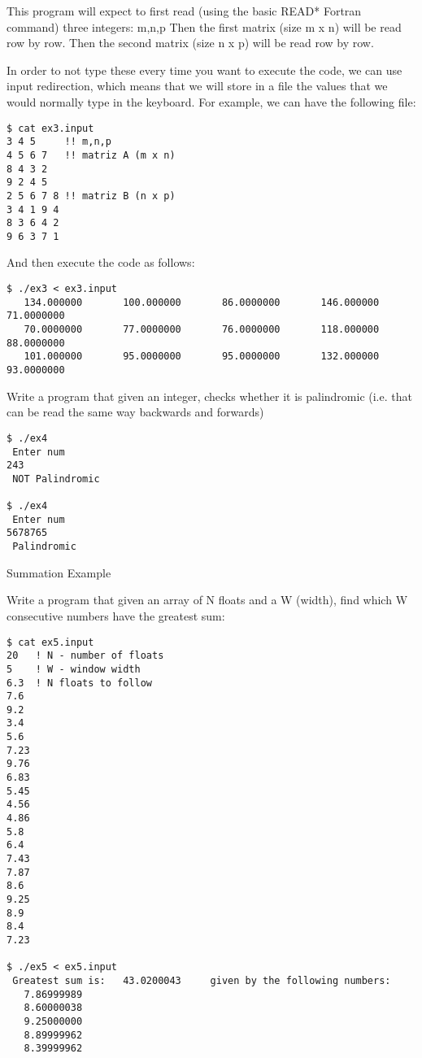 This program will expect to first read (using the basic READ* Fortran command) three integers: m,n,p
Then the first matrix (size m x n) will be read row by row.
Then the second matrix (size n x p) will be read row by row.

In order to not type these every time you want to execute the code, we can use
input redirection, which means that we will store in a file the values that we would
normally type in the keyboard. For example, we can have the following file:

\begin{verbatim}
$ cat ex3.input
3 4 5     !! m,n,p
4 5 6 7   !! matriz A (m x n)
8 4 3 2
9 2 4 5
2 5 6 7 8 !! matriz B (n x p)
3 4 1 9 4
8 3 6 4 2
9 6 3 7 1
\end{verbatim}

And then execute the code as follows:

\begin{verbatim}
$ ./ex3 < ex3.input
   134.000000       100.000000       86.0000000       146.000000       71.0000000    
   70.0000000       77.0000000       76.0000000       118.000000       88.0000000    
   101.000000       95.0000000       95.0000000       132.000000       93.0000000
\end{verbatim}

 {Write a program that given an integer, checks whether it is
  palindromic (i.e. that can be read the same way backwards and forwards)}
\label{ex:basic-palin}

\begin{verbatim}
$ ./ex4
 Enter num
243
 NOT Palindromic

$ ./ex4
 Enter num
5678765
 Palindromic
\end{verbatim}

 {Summation Example}
\label{ex:basic-summation}

Write a program that given an array of N floats and a W (width), find which W
consecutive numbers have the greatest sum:

\begin{verbatim}
$ cat ex5.input
20   ! N - number of floats
5    ! W - window width
6.3  ! N floats to follow
7.6 
9.2 
3.4 
5.6 
7.23 
9.76 
6.83 
5.45 
4.56
4.86 
5.8 
6.4 
7.43 
7.87 
8.6 
9.25 
8.9 
8.4 
7.23

$ ./ex5 < ex5.input
 Greatest sum is:   43.0200043     given by the following numbers:
   7.86999989    
   8.60000038    
   9.25000000    
   8.89999962    
   8.39999962    
\end{verbatim}

